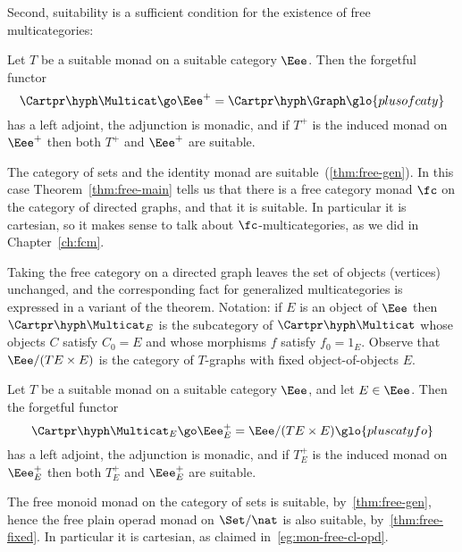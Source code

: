 Second, suitability is a sufficient condition for the existence of free
multicategories:
%
\begin{thm}	
Let $T$ be a suitable monad on a suitable category $\Eee$.  Then the
forgetful functor
\[
\Cartpr\hyph\Multicat \go \Eee^+ = \Cartpr\hyph\Graph%
% 
\glo{plusofcaty}
% 
\]
has a left adjoint, the adjunction is monadic, and if $T^+$%
% 
% 
is the induced
monad on $\Eee^+$ then both $T^+$ and $\Eee^+$ are suitable.
\end{thm}

\begin{example}	
The category of sets and the identity monad are
suitable~(\ref{thm:free-gen}).  In this case Theorem~\ref{thm:free-main}
tells us that there is a free category monad $\fc$ on the category of
directed graphs, and that it is suitable.  In particular it is cartesian, so
it makes sense to talk about $\fc$-multicategories,%
%
%
%
%
as we did in
Chapter~\ref{ch:fcm}.
\end{example}

Taking the free category on a directed graph leaves the set of objects
(vertices) unchanged, and the corresponding fact for generalized
multicategories is expressed in a variant of the theorem.  Notation: if $E$
is an object of $\Eee$ then $\Cartpr\hyph\Multicat_E$%
% 
% 
is the subcategory of
$\Cartpr\hyph\Multicat$ whose objects $C$ satisfy $C_0=E$ and whose
morphisms $f$ satisfy $f_0=1_E$.  Observe that $\Eee/(TE \times E)$ is the
category of $T$-graphs with fixed object-of-objects $E$.
%
\begin{thm}	
Let $T$ be a suitable monad on a suitable category $\Eee$, and let $E \in
\Eee$.  Then the forgetful functor
\[
\Cartpr\hyph\Multicat_E \go \Eee^+_E = \Eee/(TE \times E)%
% 
\glo{pluscatyfo}
% 
\]
has a left adjoint, the adjunction is monadic, and if $T^+_E$%
% 
% 
is the
induced monad on $\Eee^+_E$ then both $T^+_E$ and $\Eee^+_E$ are suitable.
\end{thm}

\begin{example}	
The free monoid monad on the category of sets is suitable,
by~\ref{thm:free-gen}, hence the free%
%
%
plain operad monad on $\Set/\nat$ is
also suitable, by~\ref{thm:free-fixed}.  In particular it is cartesian, as
claimed in~\ref{eg:mon-free-cl-opd}.  
\end{example}

